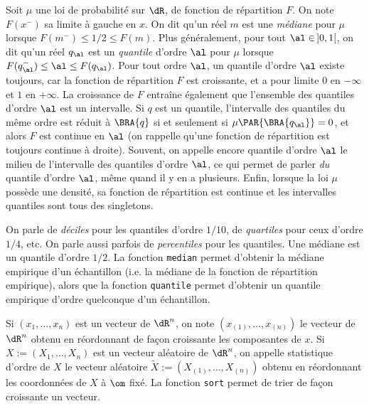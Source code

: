 
Soit $\mu$ une loi de probabilité sur $\dR$, de fonction de répartition $F$. On
note $F(x^-)$ sa limite à gauche en $x$. On dit qu'un réel $m$ est une
\emph{médiane} pour $\mu$ lorsque $F(m^-)\leq 1/2 \leq F(m)$. Plus généralement, pour
tout $\al\in\,]0,1[$, on dit qu'un réel $q_\al$ est un \emph{quantile} d'ordre
$\al$ pour $\mu$ lorsque $F(q^-_\al)\leq \al \leq F(q_\al)$. Pour tout ordre $\al$, un
quantile d'ordre $\al$ existe toujours, car la fonction de répartition $F$ est
croissante, et a pour limite $0$ en $-\infty$ et $1$ en $+\infty$. La croissance de $F$
entraîne également que l'ensemble des quantiles d'ordre $\al$ est un
intervalle. Si $q$ est un quantile, l'intervalle des quantiles du même ordre
est réduit à $\BRA{q}$ si et seulement si $\mu\PAR{\BRA{q_\al}}=0$, et alors $F$
est continue en $\al$ (on rappelle qu'une fonction de répartition est toujours
continue à droite). Souvent, on appelle encore quantile d'ordre $\al$ le
milieu de l'intervalle des quantiles d'ordre $\al$, ce qui permet de parler
\emph{du} quantile d'ordre $\al$, même quand il y en a plusieurs. Enfin,
lorsque la loi $\mu$ possède une densité, sa fonction de répartition est
continue et les intervalles quantiles sont tous des singletons.

On parle de \emph{déciles} pour les quantiles d'ordre $1/10$, de
\emph{quartiles} pour ceux d'ordre $1/4$, etc. On parle aussi parfois de
\emph{percentiles} pour les quantiles. Une médiane est un quantile d'ordre
$1/2$. La fonction \ML{} \texttt{median} permet d'obtenir la médiane empirique
d'un échantillon (i.e. la médiane de la fonction de répartition empirique),
alors que la fonction \SB{} \texttt{quantile} permet d'obtenir un quantile
empirique d'ordre quelconque d'un échantillon.

Si $(x_1,\ldots,x_n)$ est un vecteur de $\dR^n$, on note $(x_{(1)},\ldots,x_{(n)})$ le
vecteur de $\dR^n$ obtenu en réordonnant de façon croissante les composantes
de $x$. Si $X:=(X_1,\ldots,X_n)$ est un vecteur aléatoire de $\dR^n$, on appelle
statistique d'ordre de $X$ le vecteur aléatoire
$\tilde{X}:=(X_{(1)},\ldots,X_{(n)})$ obtenu en réordonnant les coordonnées de $X$
à $\om$ fixé. La fonction \ML{} \texttt{sort} permet de trier de façon
croissante un vecteur.

